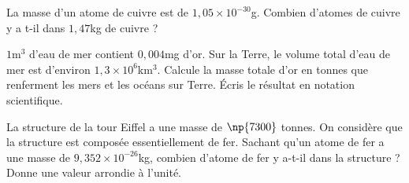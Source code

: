 \documentclass[a4paper,10pt]{report}
\begin{document}
\begin{ex}
La masse d'un atome de cuivre est de $1,05 \times 10^{-30}$g. Combien d'atomes de cuivre y a t-il dans $1,47$kg de cuivre ?
\end{ex}

\begin{ex}
$1$m$^3$ d'eau de mer contient $0,004$mg d'or. Sur la Terre, le volume total d'eau de mer est d'environ $1,3 \times 10^{6}$km$^3$. Calcule la masse totale d'or en tonnes que renferment les mers et les océans sur Terre. Écris le résultat en notation scientifique.
\end{ex}

\begin{ex}
La structure de la tour Eiffel a une masse de $\np{7300}$ tonnes. On considère que la structure est composée essentiellement de fer. Sachant qu'un atome de fer a une masse de $9,352 \times 10^{-26}$kg, combien d'atome de fer y a-t-il dans la structure ? Donne une valeur arrondie à l'unité.
\end{ex}
\end{document}
